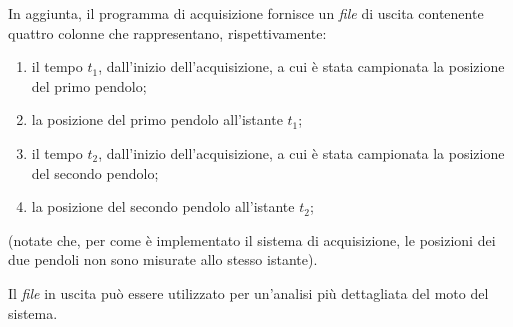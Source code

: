 \documentclass{lab1-article}
\begin{document}
\begin{article}
\subsecdataformat

In aggiunta, il programma di acquisizione fornisce un \emph{file} di uscita
contenente quattro colonne che rappresentano, rispettivamente:
\begin{enumerate}
\item il tempo $t_1$, dall'inizio dell'acquisizione, a cui \`e stata campionata
  la posizione del primo pendolo;
\item la posizione del primo pendolo all'istante $t_1$;
\item il tempo $t_2$, dall'inizio dell'acquisizione, a cui \`e stata campionata
  la posizione del secondo pendolo;
\item la posizione del secondo pendolo all'istante $t_2$;
\end{enumerate}
(notate che, per come \`e implementato il sistema di acquisizione, le posizioni
dei due pendoli non sono misurate allo stesso istante).

Il \emph{file} in uscita pu\`o essere utilizzato per un'analisi pi\`u
dettagliata del moto del sistema.



\plasduinosave

\end{article}
\end{document}
